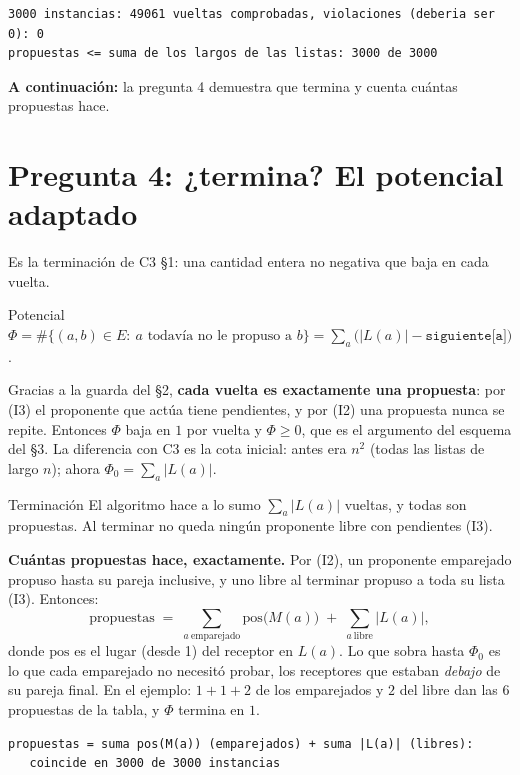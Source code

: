 \documentclass[11pt]{article}
\begin{document}
\begin{lstlisting}[style=salida,basicstyle=\ttfamily\footnotesize\color{black},columns=fixed]
3000 instancias: 49061 vueltas comprobadas, violaciones (deberia ser 0): 0
propuestas <= suma de los largos de las listas: 3000 de 3000
\end{lstlisting}
\textbf{A continuación:} la pregunta 4 demuestra que termina y cuenta cuántas propuestas hace.

\section{Pregunta 4: ¿termina? El potencial adaptado}

Es la terminación de C3 §1: una cantidad entera no negativa que baja en cada vuelta.

\begin{resultado}{Potencial}
$\Phi=\#\{(a,b)\in E:\ a\text{ todavía no le propuso a }b\}=\sum_a\bigl(|L(a)|-\texttt{siguiente[a]}\bigr)$.
\end{resultado}

Gracias a la guarda del §2, \textbf{cada vuelta es exactamente una propuesta}: por (I3) el proponente que actúa tiene
pendientes, y por (I2) una propuesta nunca se repite. Entonces $\Phi$ baja en $1$ por vuelta y $\Phi\ge0$, que es
el argumento del esquema del §3. La diferencia con C3 es la cota inicial: antes era $n^2$ (todas las listas de largo
$n$); ahora $\Phi_0=\sum_a|L(a)|$.

\begin{resultado}{Terminación}
El algoritmo hace a lo sumo $\sum_a|L(a)|$ vueltas, y todas son propuestas. Al terminar no queda ningún proponente
libre con pendientes (I3).
\end{resultado}

\textbf{Cuántas propuestas hace, exactamente.} Por (I2), un proponente emparejado propuso hasta su pareja
inclusive, y uno libre al terminar propuso a toda su lista (I3). Entonces:
\[
  \text{propuestas}\;=\;\sum_{a\ \text{emparejado}}\mathrm{pos}\bigl(M(a)\bigr)\;+\;\sum_{a\ \text{libre}}|L(a)| ,
\]
donde $\mathrm{pos}$ es el lugar (desde 1) del receptor en $L(a)$. Lo que sobra hasta $\Phi_0$ es lo que cada
emparejado no necesitó probar, los receptores que estaban \emph{debajo} de su pareja final. En el ejemplo:
$1+1+2$ de los emparejados y $2$ del libre dan las $6$ propuestas de la tabla, y $\Phi$ termina en $1$.
\begin{lstlisting}[style=salida,basicstyle=\ttfamily\footnotesize\color{black},columns=fixed]
propuestas = suma pos(M(a)) (emparejados) + suma |L(a)| (libres):
   coincide en 3000 de 3000 instancias
\end{lstlisting}
\end{document}
